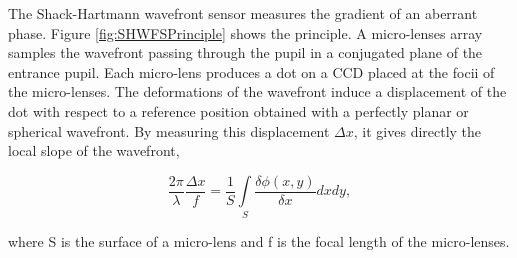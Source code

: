 The Shack-Hartmann wavefront sensor measures the gradient of an aberrant phase. Figure \ref{fig:SHWFSPrinciple} shows the principle. A micro-lenses array samples the wavefront passing through the pupil in a conjugated plane of the entrance pupil. Each micro-lens produces a dot on a CCD placed at the focii of the micro-lenses. The deformations of the wavefront induce a displacement of the dot with respect to a reference position obtained with a perfectly planar or spherical wavefront. By measuring this displacement $\Delta x$, it gives directly the local slope of the wavefront,

\begin{equation}
\frac{2\pi}{\lambda}\frac{\Delta x}{f} = \frac{1}{S} \int\limits_S \frac{\delta\phi (x,y)}{\delta x}dxdy,
\label{eqt:SHWFSlope}
\end{equation}

where S is the surface of a micro-lens and f is the focal length of the micro-lenses.